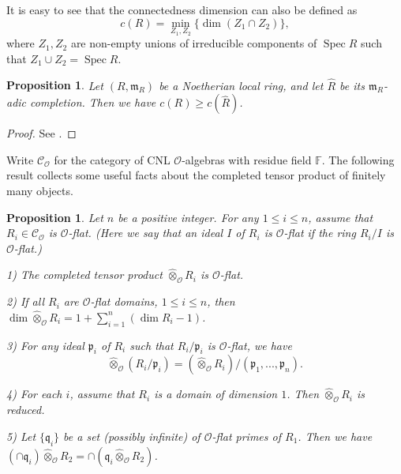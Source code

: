 \documentclass[a4paper, 12pt]{amsart}
\newtheorem{prop}[thm]{Proposition}
\DeclareMathOperator{\Spec}{Spec}
\newcommand{\cO}{\mathcal{O}}
\newcommand{\kq}{\mathfrak{q}}
\newcommand{\kp}{\mathfrak{p}}
\begin{document}
	It is easy to see that the connectedness dimension can also be defined as $$c(R)=\min_{Z_1,Z_2}\{\dim (Z_1\cap Z_2)\}, $$
	where $Z_1,Z_2$ are non-empty unions of irreducible components of $\Spec R$ such that $Z_1\cup Z_2=\Spec R$.
	
	\begin{prop}\label{connected dim}
		 Let $(R, \mathfrak{m}_R) $ be a Noetherian local ring, and let $\widehat{R}$ be its $ \mathfrak{m}_R$-adic completion. Then we have $c(R) \ge c(\widehat{R})$.
	\end{prop}
	
	\begin{proof}
		See \cite[Lemma 19.3.1]{localcoh}.
	\end{proof}
	
	Write $\mathcal{C}_{\mathcal{O}}$ for the category of CNL $\mathcal{O}$-algebras with residue field $\mathbb{F}$. The following result collects some useful facts about the completed tensor product of finitely many objects.
	
	\begin{prop}\label{com alg}
		Let $n $ be a positive integer. For any $1 \le i \le n $, assume that $R_i \in \mathcal{C}_{\mathcal{O}}$ is $\cO$-flat. (Here we say that an ideal $I$ of $R_i$ is $\cO$-flat if the ring $R_i/I$ is $\cO$-flat.)
		
		1) The completed tensor product ${\widehat{\otimes}_\cO} R_i$ is $\cO$-flat.
		
		2) If all $R_i $ are $\cO$-flat domains, $1 \le i \le n$, then $\dim {\widehat{\otimes}_\cO} R_i = 1+ \sum_{i=1}^{n} (\dim R_i -1)$.
		
		3) For any ideal $\kp_i$ of $R_i $ such that $R_i/\kp_i$ is $\cO$-flat, we have $$ 
		\widehat{\otimes}_\cO (R_i/\kp_i) =(\widehat{\otimes}_\cO R_i)/(\kp_1, ..., \kp_n). $$
		
		4) For each $i$, assume that $R_i$ is a domain of dimension $1$.  Then ${\widehat{\otimes}_\cO} R_i $ is reduced.
		
		5) Let $\{\kq_i\}$ be a set (possibly infinite) of $\cO$-flat primes of $R_1$. Then we have $(\cap \kq_i) \widehat{\otimes}_\cO R_2 = \cap (\kq_i \widehat{\otimes}_\cO R_2)$.
	\end{prop}
	
\end{document}
